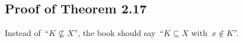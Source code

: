 \subsection{Proof of Theorem 2.17}

Instead of~\enquote{$K ⊈ X$}, the book should say~\enquote{$K ⊆ X$ with~$x ∉ K$}.
